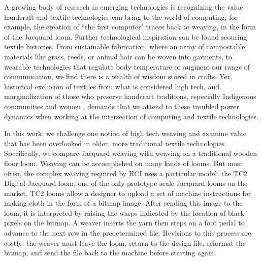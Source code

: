 
\label{ch_lp_intro}

A growing body of research in emerging technologies is recognizing the value handcraft and textile technologies can bring to the world of computing; for example, the creation of ``the first computer" traces back to weaving, in the form of the Jacquard loom. \cite{harlizius-kluck_weaving_2017} Further technological inspiration can be found scouring textile histories. From sustainable fabrication, where an array of compostable materials like grass, reeds, or animal hair can be woven into garments, to wearable technologies that regulate body temperature or augment our range of communication, we find there is a wealth of wisdom stored in crafts. Yet, historical exclusion of textiles from what is considered high tech, and marginalization of those who preserve handcraft traditions, especially Indigenous communities and women \cite{flores_weaving_2021, muskrat_magazine_indigenous_2013, rosner_making_2018}, demands that we attend to these troubled power dynamics when working at the intersection of computing and textile technologies.

In this work, we challenge one notion of high tech weaving and examine value that has been overlooked in older, more traditional textile technologies. Specifically, we compare Jacquard weaving with weaving on a traditional wooden floor loom. Weaving can be accomplished on many kinds of looms. But most often, the complex weaving required by HCI uses a particular model: the TC2 Digital Jacquard loom, one of the only prototype-scale Jacquard looms on the market. TC2 looms allow a designer to upload a set of machine instructions for making cloth in the form of a bitmap image. After sending this image to the loom, it is interpreted by raising the warps indicated by the location of black pixels on the bitmap. A weaver inserts the yarn then steps on a foot pedal to advance to the next row in the predetermined file. Revisions to this process are costly: the weaver must leave the loom, return to the design file, reformat the bitmap, and send the file back to the machine before starting again. 

